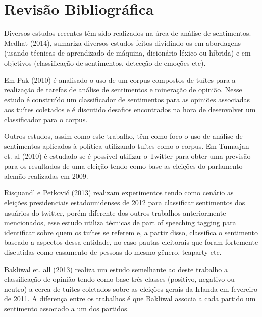\chapter{Revisão Bibliográfica}

Diversos estudos recentes têm sido realizados na área de análise de sentimentos.
Medhat (2014)\citep{medhat2014}, sumariza diversos estudos feitos dividindo-os em
abordagens (usando técnicas de aprendizado de máquina, dicionário léxico ou
híbrida) e em objetivos (classificação de sentimentos, detecção de emoções etc).

Em Pak (2010)\citep{pak2010} é analisado o uso de um corpus compostos de tuítes para
a realização de tarefas de análise de sentimentos e mineração de opinião. Nesse estudo
é construído um classificador de sentimentos para as opiniões associadas aos tuítes coletados
e é discutido desafios encontrados na hora de desenvolver um classificador para o corpus.

Outros estudos, assim como este trabalho, têm como foco o uso de análise de sentimentos
aplicados à política utilizando tuítes como o corpus. Em Tumasjan et. al (2010) é estudado
se é possível utilizar o Twitter para obter uma previsão para os resultados de uma eleição
tendo como base as eleições do parlamento alemão realizadas em 2009.

Risquandl e Petković (2013)\citep{petkovic2013} realizam experimentos tendo como cenário as
eleições presidenciais estadounidenses de 2012 para classificar sentimentos dos usuários do
twitter, porém diferente dos outros trabalhos anteriormente mencionados, esse estudo utiliza
técnicas de part of speeching tagging para identificar sobre quem os tuítes se referem e, a
partir disso, classifica o sentimento baseado a aspectos dessa entidade, no caso pautas eleitorais
que foram fortemente discutidas como casamento de pessoas do mesmo gênero, teaparty etc.

Bakliwal et. all (2013)\citep{bakliwal2013} realiza um estudo semelhante ao deste trabalho a classificação de opinião
tendo como base três classes (positivo, negativo ou neutro) a cerca de tuítes coletados sobre
as eleições gerais da Irlanda em fevereiro de 2011. A diferença entre os trabalhos é que Bakliwal
associa a cada partido um sentimento associado a um dos partidos.


